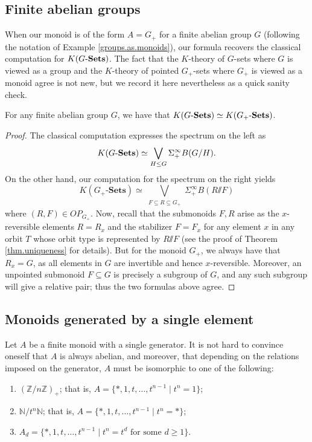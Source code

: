 \documentclass[11pt]{amsart}
\renewcommand{\ss}{\mathord{\sslash}}
\begin{document}
\subsection{Finite abelian groups}

When our monoid is of the form $A=G_+$ for a finite abelian group $G$ (following the notation of Example \ref{groups.as.monoids}), our formula recovers the classical computation for $K(G\text{-}\mathbf{Sets})$. The fact that the $K$-theory of $G$-sets where $G$ is viewed as a group and the $K$-theory of pointed $G_+$-sets where $G_+$ is viewed as a monoid agree is not new, but we record it here nevertheless as a quick sanity check.

\begin{proposition}\label{K(G)}
    For any finite abelian group $G$, we have that $K(G\text{-}\mathbf{Sets})\simeq K(G_+\text{-}\mathbf{Sets})$.
\end{proposition}
\begin{proof}
    The classical computation expresses the spectrum on the left as \[K(G\text{-}\mathbf{Sets}) \simeq \bigvee_{H \leq G} \Sigma^\infty_+ B(G/H).\] On the other hand, our computation for the spectrum on the right yields
    \[K(G_+\text{-}\mathbf{Sets}) \simeq \bigvee_{\substack{F \subseteq R \subseteq G_+}} \Sigma^\infty_+ B(R\ss F)\] where $(R,F)\in OP_{G_+}.$ %
    Now, recall that the submonoids $F,R$ arise as the $x$-reversible elements $R=R_x$ and the stabilizer $F=F_x$ for any element $x$ in any orbit $T$ whose orbit type is represented by $R\ss F$  (see the proof of Theorem \ref{thm.uniqueness} for details). But for the monoid $G_+$, we always have that $R_x=G$, as all elements in $G$ are invertible and hence $x$-reversible. Moreover, an unpointed submonoid $F\subseteq G$ is precisely a subgroup of $G$, and any such subgroup will give a relative pair; %
    thus the two formulas above agree.
\end{proof}

\subsection{Monoids generated by a single element}

Let $A$ be a finite monoid with a single generator. It is not hard to convince oneself that $A$ is always abelian, and moreover, that depending on the relations imposed on the generator, $A$ must be isomorphic to one of the following:
\begin{enumerate}
    \item $(\mathbb{Z}/n\mathbb{Z})_+$; that is, $A=\{*,1,t,\dots,t^{n-1} \mid t^n=1\}$;
    \item $\mathbb{N}/t^n\mathbb{N}$; that is, $A=\{*,1,t,\dots,t^{n-1}\mid t^n=*\}$;
    \item $A_d=\{*,1,t,\dots,t^{n-1}\mid t^n=t^d \text{ for some } d\geq 1\}$.
\end{enumerate}
\end{document}
